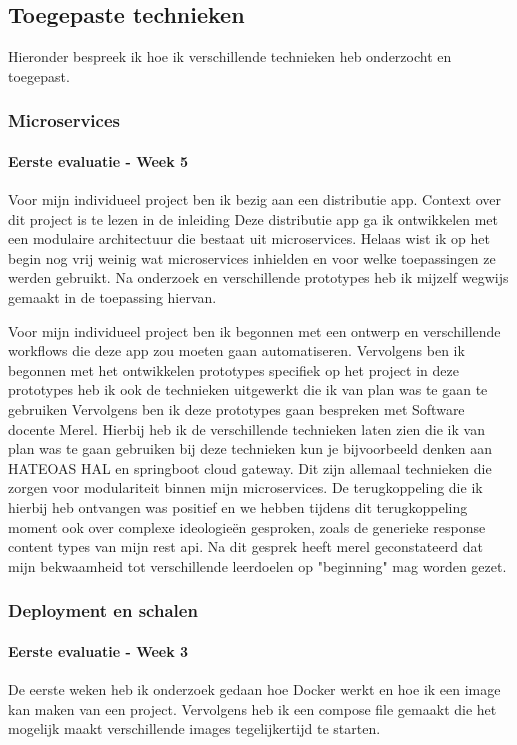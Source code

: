 \subsection{Toegepaste technieken}\label{subsec:toegepaste-technieken}
Hieronder bespreek ik hoe ik verschillende technieken heb onderzocht en toegepast.

\subsubsection{Microservices}
\paragraph{Eerste evaluatie - Week 5}
Voor mijn individueel project ben ik bezig aan een distributie app.
Context over dit project is te lezen in de inleiding
Deze distributie app ga ik ontwikkelen met een modulaire architectuur die bestaat uit microservices.
Helaas wist ik op het begin nog vrij weinig wat microservices inhielden en voor welke toepassingen ze werden gebruikt.
Na onderzoek en verschillende prototypes heb ik mijzelf wegwijs gemaakt in de toepassing hiervan.

Voor mijn individueel project ben ik begonnen met een ontwerp en verschillende workflows die deze app zou moeten gaan automatiseren.
Vervolgens ben ik begonnen met het ontwikkelen prototypes specifiek op het project in deze prototypes heb ik ook de technieken uitgewerkt die ik van plan was te gaan te gebruiken
Vervolgens ben ik deze prototypes gaan bespreken met Software docente Merel.
Hierbij heb ik de verschillende technieken laten zien die ik van plan was te gaan gebruiken bij deze technieken kun je bijvoorbeeld denken aan HATEOAS HAL en springboot cloud gateway.
Dit zijn allemaal technieken die zorgen voor modulariteit binnen mijn microservices.
De terugkoppeling die ik hierbij heb ontvangen was positief en we hebben tijdens dit terugkoppeling moment ook over complexe ideologieën gesproken, zoals de generieke response content types van mijn rest api.
Na dit gesprek heeft merel geconstateerd dat mijn bekwaamheid tot verschillende leerdoelen op "beginning" mag worden gezet.


\subsubsection{Deployment en schalen}
\paragraph{Eerste evaluatie - Week 3}
De eerste weken heb ik onderzoek gedaan hoe Docker werkt en hoe ik een image kan maken van een project.
Vervolgens heb ik een compose file gemaakt die het mogelijk maakt verschillende images tegelijkertijd te starten.

